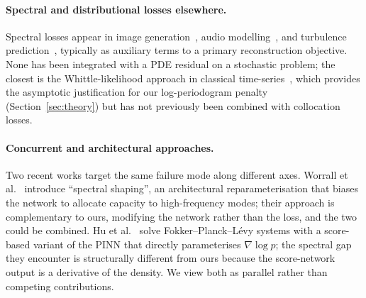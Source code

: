 \documentclass[review,12pt]{elsarticle}
\begin{document}
\paragraph{Spectral and distributional losses elsewhere.}
Spectral losses appear in image generation~\cite{Durall2020}, audio
modelling~\cite{Engel2020DDSP}, and turbulence
prediction~\cite{Chakraborty2025BSP}, typically as auxiliary terms to a
primary reconstruction objective. None has been integrated with a
PDE residual on a stochastic problem; the closest is the
Whittle-likelihood approach in classical
time-series~\cite{Whittle1953}, which provides the asymptotic
justification for our log-periodogram penalty
(Section~\ref{sec:theory}) but has not previously been combined
with collocation losses.

\paragraph{Concurrent and architectural approaches.}
Two recent works target the same failure mode along different axes.
Worrall et al.~\cite{Worrall2025SpectralShaping} introduce
``spectral shaping'', an architectural reparameterisation that
biases the network to allocate capacity to high-frequency modes;
their approach is complementary to ours, modifying the network
rather than the loss, and the two could be combined. Hu et
al.~\cite{Hu2024ScoreFPINN} solve Fokker--Planck--L\'evy systems
with a score-based variant of the PINN that directly parameterises
\(\nabla \log p\); the spectral gap they encounter is structurally
different from ours because the score-network output is a derivative
of the density. We view both as parallel rather than competing
contributions.
\end{document}
